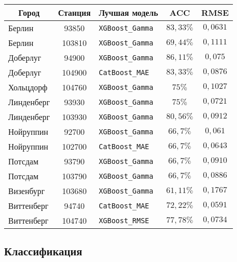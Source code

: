 \begin{multicols}{2}
\begin{table*}[b]
\begin{center}
\begin{tabular}{|l|c|l|c|c|}
\hline
\multicolumn{1}{|c|}{{\bf Город}} & 
\multicolumn{1}{c|}{{\bf Станция}} & {\bf Лучшая модель} & 
\multicolumn{1}{c|}{\bf ACC}& {\bf RMSE} \\
\hline
      Берлин &   \hphantom{9}93850 &  \verb"XGBoost_Gamma" &  $83{,}33\%$ &  $0{,}0631$ \\
      Берлин &  103810 &  \verb"XGBoost_Gamma" &  $69{,}44\%$ &  $0{,}1111$ \\
    Доберлуг &   \hphantom{9}94900 &  \verb"XGBoost_Gamma" &  $86{,}11\%$ &  $0{,}075$\hphantom{9} \\
    Доберлуг &  104900 &   \verb"CatBoost_MAE" &  $83{,}33\%$ &  $0{,}0876$ \\
    Хольцдорф&  104760 &  \verb"XGBoost_Gamma" &  $75\%$\hphantom{,99} &  $0{,}1027$ \\
  Линденберг &   \hphantom{9}93930 &  \verb"XGBoost_Gamma" & $ 75\%$\hphantom{,99} &  $0{,}0721$ \\
  Линденберг &  103930 &  \verb"XGBoost_Gamma" &  $80{,}56\%$ &  $0{,}0912$ \\
   Нойруппин &   \hphantom{9}92700 &  \verb"XGBoost_Gamma" &  $66{,}7\%$\hphantom{9} &  $0{,}061$\hphantom{9} \\
   Нойруппин &  102700 &   \verb"CatBoost_MAE" &  $66{,}7\%$\hphantom{9} &  $0{,}0643$ \\
     Потсдам &   \hphantom{9}93790 &  \verb"XGBoost_Gamma" & $66{,}7\%$\hphantom{9} &  $0{,}0910$ \\
     Потсдам &  103790 &  \verb"XGBoost_Gamma" &  $66{,}7\%$\hphantom{9} & $ 0{,}0886$ \\
  Визенбург &  103680 &  \verb"XGBoost_Gamma" & $ 61{,}11\%$ &  $0{,}1767$ \\
  Виттенберг &   \hphantom{9}94740 &   \verb"CatBoost_MAE" &  $72{,}22\%$ &  $0{,}0591$ \\
  Виттенберг &  104740 &   \verb"XGBoost_RMSE" &  $77{,}78\%$ &  $0{,}0734$ \\
\hline
\end{tabular}
\end{center}
\end{table*}

\subsection{Классификация}


\end{multicols}
